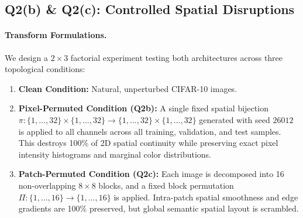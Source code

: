 \subsection{Q2(b) \& Q2(c): Controlled Spatial Disruptions}
\paragraph{Transform Formulations.}
We design a $2 \times 3$ factorial experiment testing both architectures across three topological conditions:
\begin{enumerate}
    \item \textbf{Clean Condition:} Natural, unperturbed CIFAR-10 images.
    \item \textbf{Pixel-Permuted Condition (Q2b):} A single fixed spatial bijection $\pi: \{1, \dots, 32\} \times \{1, \dots, 32\} \to \{1, \dots, 32\} \times \{1, \dots, 32\}$ generated with seed $26012$ is applied to all channels across all training, validation, and test samples. This destroys 100\% of 2D spatial continuity while preserving exact pixel intensity histograms and marginal color distributions.
    \item \textbf{Patch-Permuted Condition (Q2c):} Each image is decomposed into 16 non-overlapping $8 \times 8$ blocks, and a fixed block permutation $\Pi: \{1, \dots, 16\} \to \{1, \dots, 16\}$ is applied. Intra-patch spatial smoothness and edge gradients are 100\% preserved, but global semantic spatial layout is scrambled.
\end{enumerate}

